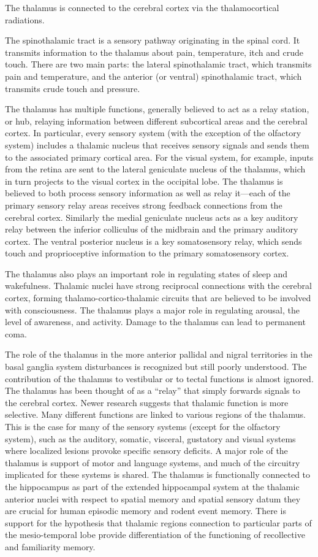 The thalamus is connected to the cerebral cortex via the thalamocortical radiations.

The spinothalamic tract is a sensory pathway originating in the spinal cord. It transmits information to the thalamus about pain, temperature, itch and crude touch. There are two main parts: the lateral spinothalamic tract, which transmits pain and temperature, and the anterior (or ventral) spinothalamic tract, which transmits crude touch and pressure.

The thalamus has multiple functions, generally believed to act as a relay station, or hub, relaying information between different subcortical areas and the cerebral cortex. In particular, every sensory system (with the exception of the olfactory system) includes a thalamic nucleus that receives sensory signals and sends them to the associated primary cortical area. For the visual system, for example, inputs from the retina are sent to the lateral geniculate nucleus of the thalamus, which in turn projects to the visual cortex in the occipital lobe. The thalamus is believed to both process sensory information as well as relay it---each of the primary sensory relay areas receives strong feedback connections from the cerebral cortex. Similarly the medial geniculate nucleus acts as a key auditory relay between the inferior colliculus of the midbrain and the primary auditory cortex. The ventral posterior nucleus is a key somatosensory relay, which sends touch and proprioceptive information to the primary somatosensory cortex.

The thalamus also plays an important role in regulating states of sleep and wakefulness. Thalamic nuclei have strong reciprocal connections with the cerebral cortex, forming thalamo-cortico-thalamic circuits that are believed to be involved with consciousness. The thalamus plays a major role in regulating arousal, the level of awareness, and activity. Damage to the thalamus can lead to permanent coma.

The role of the thalamus in the more anterior pallidal and nigral territories in the basal ganglia system disturbances is recognized but still poorly understood. The contribution of the thalamus to vestibular or to tectal functions is almost ignored. The thalamus has been thought of as a ``relay'' that simply forwards signals to the cerebral cortex. Newer research suggests that thalamic function is more selective. Many different functions are linked to various regions of the thalamus. This is the case for many of the sensory systems (except for the olfactory system), such as the auditory, somatic, visceral, gustatory and visual systems where localized lesions provoke specific sensory deficits. A major role of the thalamus is support of motor and language systems, and much of the circuitry implicated for these systems is shared. The thalamus is functionally connected to the hippocampus as part of the extended hippocampal system at the thalamic anterior nuclei with respect to spatial memory and spatial sensory datum they are crucial for human episodic memory and rodent event memory. There is support for the hypothesis that thalamic regions connection to particular parts of the mesio-temporal lobe provide differentiation of the functioning of recollective and familiarity memory.

